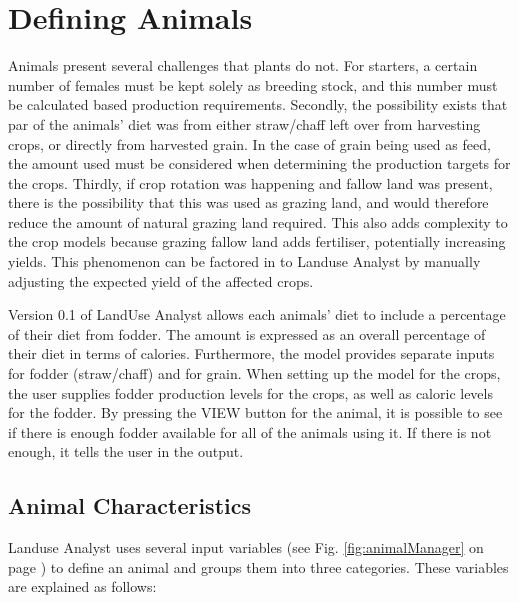 \section{Defining Animals}
  \label{definingAnimals}
Animals present several challenges that plants do not.  For starters, a certain
number of females must be kept solely as breeding stock, and this number must be
calculated based production requirements.  Secondly, the possibility exists that
par of the animals' diet was from either straw/chaff left over from harvesting
crops, or directly from harvested grain.  In the case of grain being used as
feed, the amount used must be considered when determining the production targets
for the crops.  Thirdly, if crop rotation was happening and fallow land was
present, there is the possibility that this was used as grazing land, and would
therefore reduce the amount of natural grazing land required.  This also adds
complexity to the crop models because grazing fallow land adds fertiliser,
potentially increasing yields.  This phenomenon can be factored in to Landuse
Analyst by manually adjusting the expected yield of the affected crops.

Version 0.1 of LandUse Analyst allows each animals' diet to include a percentage
of their diet from fodder.  The amount is expressed as an overall percentage of
their diet in terms of calories.  Furthermore, the model provides separate
inputs for fodder (straw/chaff) and for grain.  When setting up the model for
the crops, the user supplies fodder production levels for the crops, as well as
caloric levels for the fodder.  By pressing the VIEW button for the animal, it
is possible to see if there is enough fodder available for all of the animals
using it.  If there is not enough, it tells the user in the output.

  \subsection{Animal Characteristics}
  Landuse Analyst uses several input variables (see Fig. \ref{fig:animalManager}
on page \pageref{fig:animalManager}) to define an animal and groups them into
three categories.  These variables are explained as follows:

